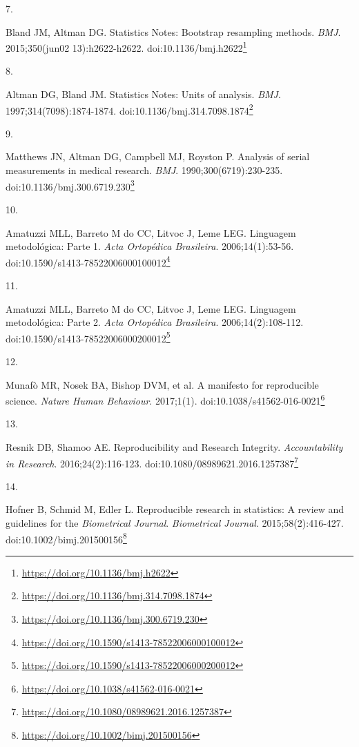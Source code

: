 \documentclass[
  a4paper,
]{book}
\newlength{\cslhangindent}
\newlength{\csllabelwidth}
\newlength{\cslentryspacingunit} %
\newenvironment{CSLReferences}[2] %
 {%
  \setlength{\parindent}{0pt}
  \ifodd #1
  \let\oldpar\par
  \def\par{\hangindent=\cslhangindent\oldpar}
  \fi
  \setlength{\parskip}{#2\cslentryspacingunit}
 }%
 {}
\newcommand{\CSLLeftMargin}[1]{\parbox[t]{\csllabelwidth}{#1}}
\newcommand{\CSLRightInline}[1]{\parbox[t]{\linewidth - \csllabelwidth}{#1}\break}
\renewcommand{\href}[2]{#2\footnote{\url{#1}}}
\begin{document}
\begin{CSLReferences}{0}{0}
\leavevmode{}%
\CSLLeftMargin{7. }%
\CSLRightInline{Bland JM, Altman DG. Statistics Notes: Bootstrap resampling methods. \emph{BMJ}. 2015;350(jun02 13):h2622-h2622. doi:\href{https://doi.org/10.1136/bmj.h2622}{10.1136/bmj.h2622}}

\leavevmode{}%
\CSLLeftMargin{8. }%
\CSLRightInline{Altman DG, Bland JM. Statistics Notes: Units of analysis. \emph{BMJ}. 1997;314(7098):1874-1874. doi:\href{https://doi.org/10.1136/bmj.314.7098.1874}{10.1136/bmj.314.7098.1874}}

\leavevmode{}%
\CSLLeftMargin{9. }%
\CSLRightInline{Matthews JN, Altman DG, Campbell MJ, Royston P. Analysis of serial measurements in medical research. \emph{BMJ}. 1990;300(6719):230-235. doi:\href{https://doi.org/10.1136/bmj.300.6719.230}{10.1136/bmj.300.6719.230}}

\leavevmode{}%
\CSLLeftMargin{10. }%
\CSLRightInline{Amatuzzi MLL, Barreto M do CC, Litvoc J, Leme LEG. Linguagem metodológica: Parte 1. \emph{Acta Ortopédica Brasileira}. 2006;14(1):53-56. doi:\href{https://doi.org/10.1590/s1413-78522006000100012}{10.1590/s1413-78522006000100012}}

\leavevmode{}%
\CSLLeftMargin{11. }%
\CSLRightInline{Amatuzzi MLL, Barreto M do CC, Litvoc J, Leme LEG. Linguagem metodológica: Parte 2. \emph{Acta Ortopédica Brasileira}. 2006;14(2):108-112. doi:\href{https://doi.org/10.1590/s1413-78522006000200012}{10.1590/s1413-78522006000200012}}

\leavevmode{}%
\CSLLeftMargin{12. }%
\CSLRightInline{Munafò MR, Nosek BA, Bishop DVM, et al. A manifesto for reproducible science. \emph{Nature Human Behaviour}. 2017;1(1). doi:\href{https://doi.org/10.1038/s41562-016-0021}{10.1038/s41562-016-0021}}

\leavevmode{}%
\CSLLeftMargin{13. }%
\CSLRightInline{Resnik DB, Shamoo AE. Reproducibility and Research Integrity. \emph{Accountability in Research}. 2016;24(2):116-123. doi:\href{https://doi.org/10.1080/08989621.2016.1257387}{10.1080/08989621.2016.1257387}}

\leavevmode{}%
\CSLLeftMargin{14. }%
\CSLRightInline{Hofner B, Schmid M, Edler L. Reproducible research in statistics: A review and guidelines for the {\emph{Biometrical Journal}}. \emph{Biometrical Journal}. 2015;58(2):416-427. doi:\href{https://doi.org/10.1002/bimj.201500156}{10.1002/bimj.201500156}}


\end{CSLReferences}
\end{document}
